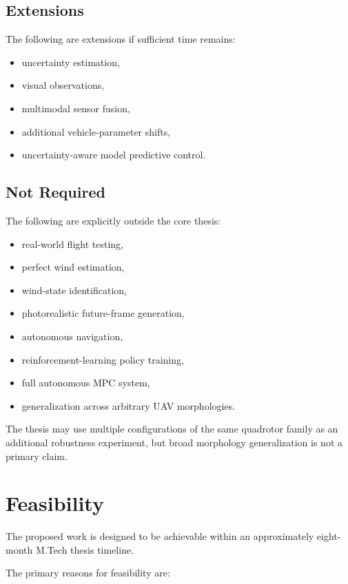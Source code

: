 \documentclass[conference]{IEEEtran}
\begin{document}
\subsection{Extensions}

The following are extensions if sufficient time remains:

\begin{itemize}
    \item uncertainty estimation,
    \item visual observations,
    \item multimodal sensor fusion,
    \item additional vehicle-parameter shifts,
    \item uncertainty-aware model predictive control.
\end{itemize}


\subsection{Not Required}

The following are explicitly outside the core thesis:

\begin{itemize}
    \item real-world flight testing,
    \item perfect wind estimation,
    \item wind-state identification,
    \item photorealistic future-frame generation,
    \item autonomous navigation,
    \item reinforcement-learning policy training,
    \item full autonomous MPC system,
    \item generalization across arbitrary UAV morphologies.
\end{itemize}

The thesis may use multiple configurations of the same quadrotor family
as an additional robustness experiment, but broad morphology
generalization is not a primary claim.


\section{Feasibility}


The proposed work is designed to be achievable within an approximately eight-month M.Tech thesis timeline.

The primary reasons for feasibility are:
\end{document}
